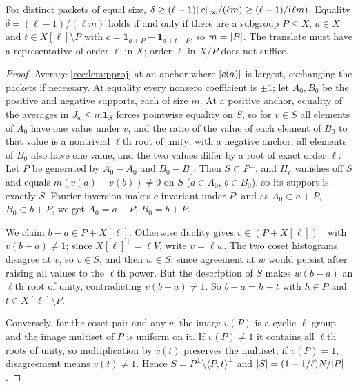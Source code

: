 \begin{theorem}\label{rec:thm:pmass}
For distinct packets of equal size, $\delta\ge(\ell-1)\lVert c\rVert_\infty/(\ell m)\ge(\ell-1)/(\ell m)$. Equality $\delta=(\ell-1)/(\ell m)$
holds if and only if there are a subgroup $P\le X$, $a\in X$ and $t\in X[\ell]\setminus P$ with
$c=\mathbf 1_{a+P}-\mathbf 1_{a+t+P}$, so $m=\lvert P\rvert$. The translate must have a representative of order $\ell$ in $X$; order $\ell$ in
$X/P$ does not suffice.
\end{theorem}

\begin{proof}
Average \cref{rec:lem:pproj} at an anchor where $\lvert c(a)\rvert$ is largest, exchanging the packets if necessary. At
equality every nonzero coefficient is $\pm1$; let $A_0,B_0$ be the positive and negative supports, each of
size $m$. At a positive anchor, equality of the averages in $J_a\le m\mathbf 1_S$ forces pointwise equality on $S$,
so for $v\in S$ all elements of $A_0$ have one value under $v$, and the ratio of the value of each element of $B_0$
to that value is a nontrivial $\ell$th root of unity; with a negative anchor, all elements of $B_0$ also have one
value, and the two values differ by a root of exact order $\ell$. Let $P$ be generated by $A_0-A_0$ and $B_0-B_0$.
Then $S\subset P^\perp$, and $H_c$ vanishes off $S$ and equals $m(v(a)-v(b))\ne0$ on $S$ ($a\in A_0$, $b\in B_0$), so its support
is exactly $S$. Fourier inversion makes $c$ invariant under $P$, and as $A_0\subset a+P$, $B_0\subset b+P$, we get
$A_0=a+P$, $B_0=b+P$.

We claim $b-a\in P+X[\ell]$. Otherwise duality gives $v\in(P+X[\ell])^\perp$ with $v(b-a)\ne1$; since $X[\ell]^\perp=\ell V$, write
$v=\ell w$. The two coset histograms disagree at $v$, so $v\in S$, and then $w\in S$, since agreement at $w$ would
persist after raising all values to the $\ell$th power. But the description of $S$ makes $w(b-a)$ an $\ell$th root of
unity, contradicting $v(b-a)\ne1$. So $b-a=h+t$ with $h\in P$ and $t\in X[\ell]\setminus P$.

Conversely, for the coset pair and any $v$, the image $v(P)$ is a cyclic $\ell$-group and the image multiset of
$P$ is uniform on it. If $v(P)\ne1$ it contains all $\ell$th roots of unity, so multiplication by $v(t)$ preserves
the multiset; if $v(P)=1$, disagreement means $v(t)\ne1$. Hence $S=P^\perp\setminus\langle P,t\rangle^\perp$ and $\lvert S\rvert=(1-1/\ell)N/\lvert P\rvert$.
\end{proof}

